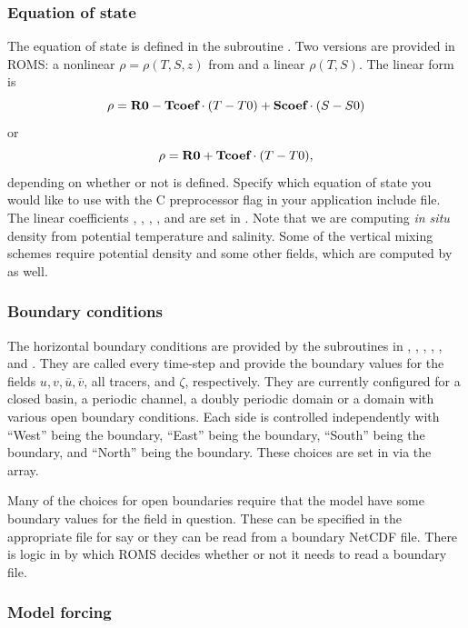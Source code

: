 \subsubsection{Equation of state}
The equation of state is defined in the subroutine .  Two
versions are provided in ROMS: a nonlinear $\rho =
\rho(T,S,z)$ from \citet{Jackett} and a linear
$\rho(T,S)$.  The linear form is
$$
      \rho = \mbox{\bf R0} - \mbox{\bf Tcoef} \cdot (T-T0) +
      \mbox{\bf Scoef} \cdot (S-S0)
$$
or
$$
     \rho = \mbox{\bf R0} + \mbox{\bf Tcoef} \cdot (T-T0),
$$
depending on whether or not
 is defined.  Specify which equation of state you
would like to use with the  C preprocessor flag in your
application include file. The linear coefficients , ,
, , and  are set in . Note
that we are computing {\em in situ} density from potential temperature and
salinity. Some of the vertical mixing schemes require potential density
and some other fields, which are computed by  as well.

\subsubsection{Boundary conditions}
\label{Bcs}
The horizontal boundary conditions are provided by the subroutines
in , , , ,
, and .  They are called every time-step
and provide the boundary values for the fields $u, v, \overline{u},
\overline{v}$, all tracers, and $\zeta$, respectively. They are currently
configured for a closed basin, a periodic channel, a doubly periodic
domain or a domain with various open boundary conditions. Each side is
controlled independently with ``West'' being the  boundary,
``East'' being the  boundary, ``South'' being the 
boundary, and ``North'' being the  boundary. These choices are
set in  via the  array.

Many of the choices for open boundaries require that the model have
some boundary values for the field in question. These can be specified in
the appropriate  file for say  or
they can be read from a boundary NetCDF file. There is logic in
 by which ROMS decides whether or not it needs to
read a boundary file.

\subsubsection{Model forcing}
\label{Mforce}

